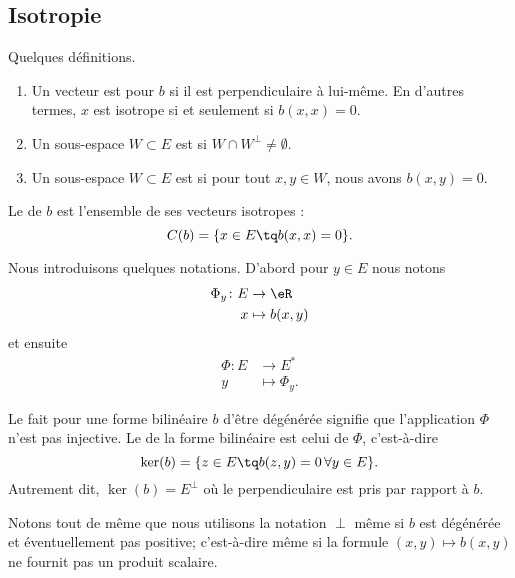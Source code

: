 \subsection{Isotropie}

\begin{definition}   \label{DefVKMnUEM}
	Quelques définitions.
	\begin{enumerate}
		\item
		      Un vecteur est  pour \( b\) si il est perpendiculaire à lui-même. En d'autres termes, \( x\) est isotrope si et seulement si \( b(x,x)=0\).
		\item
		      Un sous-espace \( W\subset E\) est  si \( W\cap W^{\perp}\neq \emptyset\).
		\item

		      Un sous-espace \( W\subset E\) est  si pour tout \( x,y\in W\), nous avons \( b(x,y)=0\).
	\end{enumerate}

	Le  de \( b\) est l'ensemble de ses vecteurs isotropes :
	\begin{equation}
		C(b)=\{ x\in E\tq b(x,x)=0 \}.
	\end{equation}
\end{definition}
Nous introduisons quelques notations. D'abord pour \( y\in E\) nous notons
\begin{equation}
	\begin{aligned}
		\Phi_y\colon E & \to \eR        \\
		x              & \mapsto b(x,y)
	\end{aligned}
\end{equation}
et ensuite
\begin{equation}
	\begin{aligned}
		\Phi\colon E & \to E^*         \\
		y            & \mapsto \Phi_y.
	\end{aligned}
\end{equation}

\begin{definition}		\label{DEFooHKQVooPuWZiP}
	Le fait pour une forme bilinéaire \( b\) d'être dégénérée signifie que l'application \( \Phi\) n'est pas injective. Le  de la forme bilinéaire est celui de \( \Phi\), c'est-à-dire
	\begin{equation}
		\ker(b)=\{ z\in E\tq b(z,y)=0\,\forall y\in E \}.
	\end{equation}
	Autrement dit, \( \ker(b)=E^{\perp}\) où le perpendiculaire est pris par rapport à \( b\).
\end{definition}
Notons tout de même que nous utilisons la notation \( \perp\) même si \( b\) est dégénérée et éventuellement pas positive; c'est-à-dire même si la formule \( (x,y)\mapsto b(x,y)\) ne fournit pas un produit scalaire.


